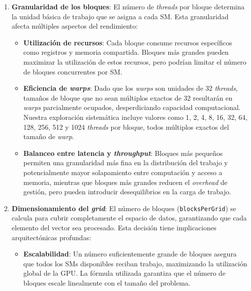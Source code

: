         \begin{enumerate}
        
            \item \textbf{Granularidad de los bloques}: El número de \textit{threads} por bloque determina la unidad básica de trabajo que se asigna a cada SM. Esta granularidad afecta múltiples aspectos del rendimiento:
            
                \begin{itemize}
                
                    \item \textbf{Utilización de recursos}: Cada bloque consume recursos específicos como registros y memoria compartida. Bloques más grandes pueden maximizar la utilización de estos recursos, pero podrían limitar el número de bloques concurrentes por SM.
                    
                    \item \textbf{Eficiencia de \textit{warps}}: Dado que los \textit{warps} son unidades de 32 \textit{threads}, tamaños de bloque que no sean múltiplos exactos de 32 resultarán en \textit{warps} parcialmente ocupados, desperdiciando capacidad computacional. Nuestra exploración sistemática incluye valores como 1, 2, 4, 8, 16, 32, 64, 128, 256, 512 y 1024 \textit{threads} por bloque, todos múltiplos exactos del tamaño de \textit{warp}.
                    
                    \item \textbf{Balanceo entre latencia y \textit{throughput}}: Bloques más pequeños permiten una granularidad más fina en la distribución del trabajo y potencialmente mayor solapamiento entre computación y acceso a memoria, mientras que bloques más grandes reducen el \textit{overhead} de gestión, pero pueden introducir desequilibrios en la carga de trabajo.
                    
                \end{itemize}
    
             \item \textbf{Dimensionamiento del \textit{grid}}: El número de bloques (\texttt{blocksPerGrid}) se calcula para cubrir completamente el espacio de datos, garantizando que cada elemento del vector sea procesado. Esta decisión tiene implicaciones arquitectónicas profundas:
                
                \begin{itemize}
                
                    \item \textbf{Escalabilidad}: Un número suficientemente grande de bloques asegura que todos los SMs disponibles reciban trabajo, maximizando la utilización global de la GPU. La fórmula utilizada garantiza que el número de bloques escale linealmente con el tamaño del problema.
                    

\end{itemize}
\end{enumerate}
